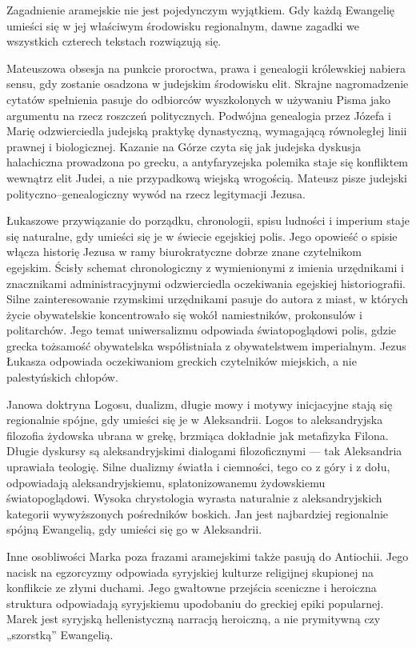 Zagadnienie aramejskie nie jest pojedynczym wyjątkiem.
Gdy każdą Ewangelię umieści się w jej właściwym środowisku regionalnym, dawne zagadki we wszystkich czterech tekstach rozwiązują się.

Mateuszowa obsesja na punkcie proroctwa, prawa i genealogii królewskiej nabiera sensu, gdy zostanie osadzona w judejskim środowisku elit.
Skrajne nagromadzenie cytatów spełnienia pasuje do odbiorców wyszkolonych w używaniu Pisma jako argumentu na rzecz roszczeń politycznych.
Podwójna genealogia przez Józefa i Marię odzwierciedla judejską praktykę dynastyczną, wymagającą równoległej linii prawnej i biologicznej.
Kazanie na Górze czyta się jak judejska dyskusja halachiczna prowadzona po grecku, a antyfaryzejska polemika staje się konfliktem wewnątrz elit Judei, a nie przypadkową wiejską wrogością.
Mateusz pisze judejski polityczno–genealogiczny wywód na rzecz legitymacji Jezusa.

Łukaszowe przywiązanie do porządku, chronologii, spisu ludności i imperium staje się naturalne, gdy umieści się je w świecie egejskiej polis.
Jego opowieść o spisie włącza historię Jezusa w ramy biurokratyczne dobrze znane czytelnikom egejskim.
Ścisły schemat chronologiczny z wymienionymi z imienia urzędnikami i znacznikami administracyjnymi odzwierciedla oczekiwania egejskiej historiografii.
Silne zainteresowanie rzymskimi urzędnikami pasuje do autora z miast, w których życie obywatelskie koncentrowało się wokół namiestników, prokonsulów i politarchów.
Jego temat uniwersalizmu odpowiada światopoglądowi polis, gdzie grecka tożsamość obywatelska współistniała z obywatelstwem imperialnym.
Jezus Łukasza odpowiada oczekiwaniom greckich czytelników miejskich, a nie palestyńskich chłopów.

Janowa doktryna Logosu, dualizm, długie mowy i motywy inicjacyjne stają się regionalnie spójne, gdy umieści się je w Aleksandrii.
Logos to aleksandryjska filozofia żydowska ubrana w grekę, brzmiąca dokładnie jak metafizyka Filona.
Długie dyskursy są aleksandryjskimi dialogami filozoficznymi — tak Aleksandria uprawiała teologię.
Silne dualizmy światła i ciemności, tego co z góry i z dołu, odpowiadają aleksandryjskiemu, splatonizowanemu żydowskiemu światopoglądowi.
Wysoka chrystologia wyrasta naturalnie z aleksandryjskich kategorii wywyższonych pośredników boskich.
Jan jest najbardziej regionalnie spójną Ewangelią, gdy umieści się go w Aleksandrii.

Inne osobliwości Marka poza frazami aramejskimi także pasują do Antiochii.
Jego nacisk na egzorcyzmy odpowiada syryjskiej kulturze religijnej skupionej na konflikcie ze złymi duchami.
Jego gwałtowne przejścia sceniczne i heroiczna struktura odpowiadają syryjskiemu upodobaniu do greckiej epiki popularnej.
Marek jest syryjską hellenistyczną narracją heroiczną, a nie prymitywną czy „szorstką” Ewangelią.

